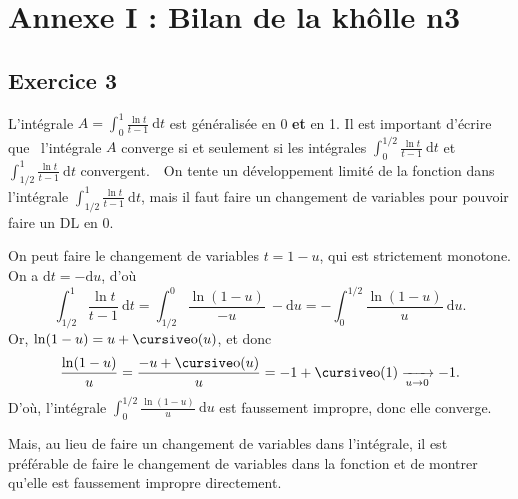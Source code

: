 \section*{Annexe I : Bilan de la khôlle n3}

\subsection*{Exercice 3}

L'intégrale $A = \int_{0}^{1} \frac{\ln t}{t - 1}~\mathrm{d}t$\/ est généralisée en 0 {\bf et}\/ en 1. Il est important d'écrire que \guillemotleft~l'intégrale $A$\/ converge si et seulement si les intégrales $\int_{0}^{1/2} \frac{\ln t}{t-1}~\mathrm{d}t$\/ et $\int_{1/2}^{1} \frac{\ln t}{t-1}~\mathrm{d}t$\/ convergent.~\guillemotright\ On tente un développement limité de la fonction dans l'intégrale $\int_{1/2}^{1} \frac{\ln t}{t - 1}~\mathrm{d}t$, mais il faut faire un changement de variables pour pouvoir faire un $\mathrm{DL}$\/ en 0.

On peut faire le changement de variables $t = 1 - u$, qui est strictement monotone. On a $\mathrm{d}t = - \mathrm{d}u$, d'où \[
	\int_{1 / 2}^{1} \frac{\ln t}{t - 1}~\mathrm{d}t = \int_{1 / 2}^{0} \frac{\ln (1-u)}{-u}~-\mathrm{d}u = - \int_{0}^{1 / 2} \frac{\ln(1-u)}{u}~\mathrm{d}u
.\]
Or, $\ln(1-u) = u + \po(u)$, et donc \[
	\frac{\ln(1-u)}{u} = \frac{-u+ \po(u)}{u} = -1 + \po(1) \tendsto{u \to 0} - 1
.\]
D'où, l'intégrale $\int_{0}^{1 / 2} \frac{\ln(1-u)}{u}~\mathrm{d}u$\/ est faussement impropre, donc elle converge.

Mais, au lieu de faire un changement de variables dans l'intégrale, il est préférable de faire le changement de variables dans la fonction et de montrer qu'elle est faussement impropre directement.
